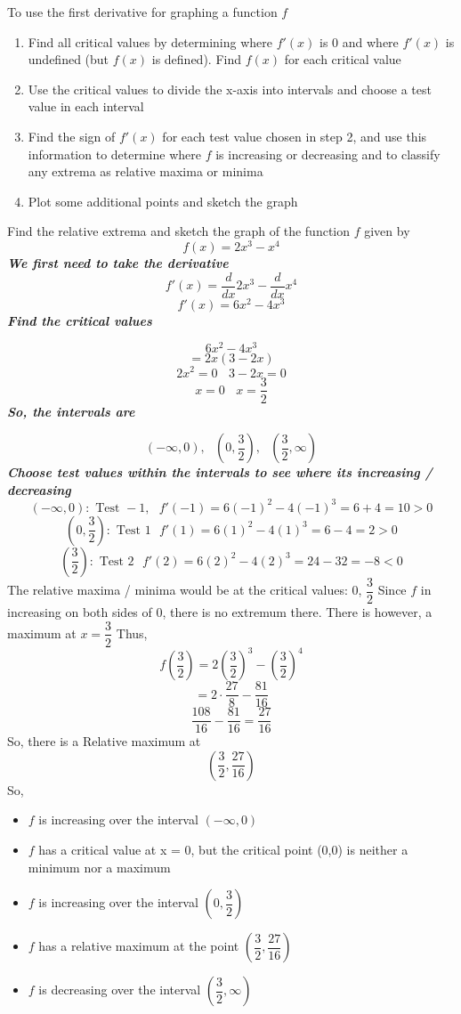 \documentclass{report}
\begin{document}
\bigbreak \noindent
To use the first derivative for graphing a function $f$
\begin{enumerate}
  \item Find all critical values by determining where $f'(x)$ is 0 and where $f'(x)$ is undefined (but $f(x)$ is defined). Find $f(x)$ for each critical value
  \item Use the critical values to divide the x-axis into intervals and choose a test value in each interval
  \item Find the sign of $f'(x)$ for each test value chosen in step 2, and use this information to determine where $f$ is increasing or decreasing and to classify any extrema as relative maxima or minima
  \item Plot some additional points and sketch the graph
\end{enumerate}

\pagebreak
\q
Find the relative extrema and sketch the graph of the function $f$ given by
$$ f(x) = 2x^3  - x^4$$
\textit{\textbf{We first need to take the derivative}}
$$ f'(x) = \frac{d}{dx}2x^3 - \frac{d}{dx}x^4$$
$$ f'(x) = 6x^2 - 4x^3$$
\textit{\textbf{Find the critical values}}

$$ 6x^2 - 4x^3$$
$$ = 2x(3-2x)$$
$$ 2x^2 = 0 \ \ \ \ 3 - 2x = 0$$
$$ x = 0 \ \ \ \ x = \dfrac{3}{2}$$
\textit{\textbf{So, the intervals are}}

$$ (-\infty,0), \ \ \ (0,\dfrac{3}{2}), \ \ \ (\dfrac{3}{2}, \infty)$$
\bigbreak \noindent
\textit{\textbf{Choose test values within the intervals to see where its increasing / decreasing}}
$$(-\infty, 0): \text{ Test } -1, \ \ \ f'(-1) = 6(-1)^2 - 4(-1)^3 = 6 + 4 = 10 > 0$$
$$ (0,\dfrac{3}{2}): \text{ Test } 1 \ \ \ f'(1) = 6(1)^2-4(1)^3 = 6 -4 = 2 > 0$$
$$ (\dfrac{3}{2}): \text{ Test } 2 \ \ \ f'(2) = 6(2)^2 -4(2)^3 = 24 -32 = -8 < 0$$
\bigbreak \noindent
The relative maxima / minima would be at the critical values: 0, $\dfrac{3}{2}$
\bigbreak \noindent
Since $f$ in increasing on both sides of 0, there is no extremum there.
There is however, a maximum at $ x = \dfrac{3}{2}$ Thus, 
$$ f\left(\dfrac{3}{2}\right) = 2\left(\dfrac{3}{2}\right)^3 - \left(\dfrac{3}{2}\right)^4$$
$$ = 2 \cdot \dfrac{27}{8} - \dfrac{81}{16}$$
$$ \dfrac{108}{16} - \dfrac{81}{16} = \dfrac{27}{16}$$
\bigbreak \noindent
So, there is a Relative maximum at
$$ \left(\dfrac{3}{2}, \dfrac{27}{16}\right)$$
\bigbreak \noindent
So,
\begin{itemize}
  \item $f$ is increasing over the interval $(-\infty, 0)$
  \item $f$ has a critical value at x = 0, but the critical point (0,0) is neither a minimum nor a maximum
  \item $f$ is increasing over the interval $(0,\dfrac{3}{2})$
  \item $f$ has a relative maximum at the point $ \left(\dfrac{3}{2}, \dfrac{27}{16}\right)$
  \item $f$ is decreasing over the interval $(\dfrac{3}{2},\infty)$
\end{itemize}
\end{document}
